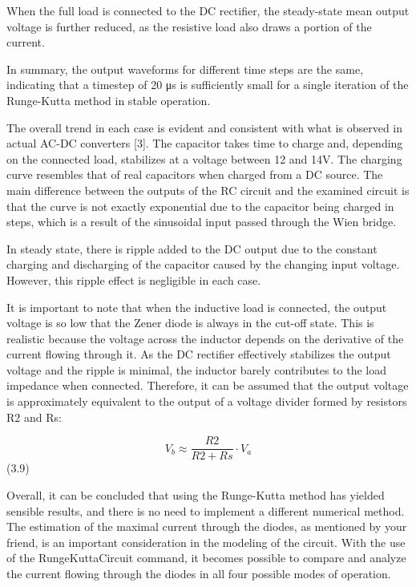 
When the full load is connected to the DC rectifier, the steady-state mean output voltage is further reduced, as the resistive load also draws a portion of the current.

In summary, the output waveforms for different time steps are the same, indicating that a timestep of 20 μs is sufficiently small for a single iteration of the Runge-Kutta method in stable operation.

The overall trend in each case is evident and consistent with what is observed in actual AC-DC converters [3]. The capacitor takes time to charge and, depending on the connected load, stabilizes at a voltage between 12 and 14V. The charging curve resembles that of real capacitors when charged from a DC source. The main difference between the outputs of the RC circuit and the examined circuit is that the curve is not exactly exponential due to the capacitor being charged in steps, which is a result of the sinusoidal input passed through the Wien bridge.

In steady state, there is ripple added to the DC output due to the constant charging and discharging of the capacitor caused by the changing input voltage. However, this ripple effect is negligible in each case.

It is important to note that when the inductive load is connected, the output voltage is so low that the Zener diode is always in the cut-off state. This is realistic because the voltage across the inductor depends on the derivative of the current flowing through it. As the DC rectifier effectively stabilizes the output voltage and the ripple is minimal, the inductor barely contributes to the load impedance when connected. Therefore, it can be assumed that the output voltage is approximately equivalent to the output of a voltage divider formed by resistors R2 and Rs:

\[V_b \approx \frac{R2}{R2 + Rs} \cdot V_a\]   (3.9)

Overall, it can be concluded that using the Runge-Kutta method has yielded sensible results, and there is no need to implement a different numerical method.\\

The estimation of the maximal current through the diodes, as mentioned by your friend, is an important consideration in the modeling of the circuit. With the use of the RungeKuttaCircuit command, it becomes possible to compare and analyze the current flowing through the diodes in all four possible modes of operation.

